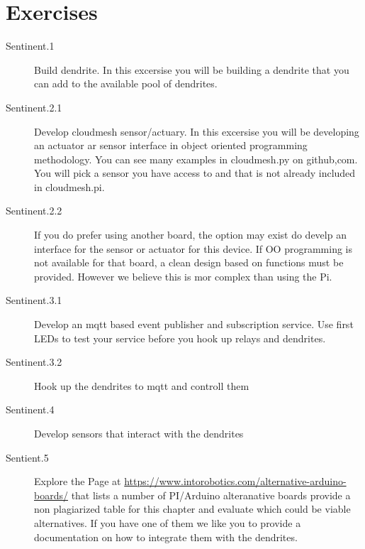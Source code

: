 \section{Exercises}

\begin{description}

\item[Sentinent.1] Build dendrite. In this excersise you will be
  building a dendrite that you can add to the available pool of dendrites.
\item[Sentinent.2.1] Develop cloudmesh sensor/actuary. In this excersise
  you will be developing an actuator ar sensor interface in object
  oriented programming methodology. You can see many examples in
  cloudmesh.py on github,com. You will pick a sensor you have access
  to and that is not already included in cloudmesh.pi. 
\item[Sentinent.2.2] If you do
  prefer using another board, the option may exist do develp an
  interface for the sensor or actuator for this device. If OO
  programming is not available for that board, a clean design based on
  functions must be provided. However we believe this is mor complex
  than using the Pi. 
\item[Sentinent.3.1] Develop an mqtt based event publisher and
  subscription service. Use first LEDs to test your service before you
  hook up relays and dendrites.
\item[Sentinent.3.2] Hook up the dendrites to mqtt and controll them
\item[Sentinent.4] Develop sensors that interact with the dendrites
\item[Sentient.5] Explore the Page at
  \url{https://www.intorobotics.com/alternative-arduino-boards/} that
  lists a number of PI/Arduino alteranative boards provide a non
  plagiarized table for this chapter and evaluate which could be
  viable alternatives. If you have one of them we like you to provide
  a documentation on how to integrate them with the dendrites.

\end{description}

 
